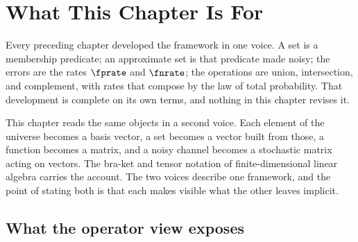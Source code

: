 %
%
\providecommand{\ket}[1]{\lvert #1 \rangle}
\providecommand{\bra}[1]{\langle #1 \rvert}
\providecommand{\ketbra}[2]{\lvert #1 \rangle\!\langle #2 \rvert}
\providecommand{\Kron}{\mathbin{\otimes}}

\section{What This Chapter Is For}
\label{sec:operator-what-for}

Every preceding chapter developed the framework in one voice. A set is a
membership predicate; an approximate set is that predicate made noisy; the
errors are the rates $\fprate$ and $\fnrate$; the operations are union,
intersection, and complement, with rates that compose by the law of total
probability. That development is complete on its own terms, and nothing in this
chapter revises it.

This chapter reads the same objects in a second voice. Each element of the
universe becomes a basis vector, a set becomes a vector built from those, a
function becomes a matrix, and a noisy channel becomes a stochastic matrix
acting on vectors. The bra-ket and tensor notation of finite-dimensional linear
algebra carries the account. The two voices describe one framework, and the
point of stating both is that each makes visible what the other leaves
implicit.

\subsection*{What the operator view exposes}

